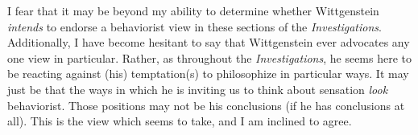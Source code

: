 \documentclass[man,12pt,natbib]{apa6}
\begin{document}
I fear that it may be beyond my ability to determine whether Wittgenstein
\emph{intends} to endorse a behaviorist view in these sections of the
\emph{Investigations}. Additionally, I have become hesitant to say that
Wittgenstein ever advocates any one view in particular.  Rather, as throughout
the \emph{Investigations}, he seems here to be reacting against (his)
temptation(s) to philosophize in particular ways. It may just be that the ways
in which he is inviting us to think about sensation \emph{look} behaviorist.
Those positions may not be his conclusions (if he has conclusions at all). This
is the view which \citet{McGinn97} seems to take, and I am inclined to agree.
\end{document}
